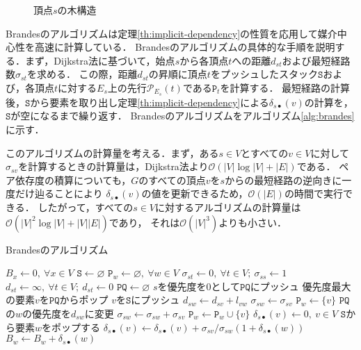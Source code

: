 \begin{figure}[tb]
  \centering
  \def\svgwidth{.35\linewidth}
  
  \caption{頂点$s$の木構造}
  \label{fig:implicit-dependency-2}
\end{figure}

Brandesのアルゴリズムは定理\ref{th:implicit-dependency}の性質を応用して媒介中心性を高速に計算している．
Brandesのアルゴリズムの具体的な手順を説明する．まず，Dijkstra法に基づいて，始点$s$から各頂点$t$への距離$d_{st}$および最短経路数$\sigma_{st}$を求める．
この際，距離$d_{st}$の昇順に頂点$t$をプッシュしたスタック$\texttt{S}$および，各頂点$t$に対する$E_{s}$上の先行$\mathcal{P}_{E_s}(t)$である$\texttt{P}_t$を計算する．
最短経路の計算後，$\texttt{S}$から要素を取り出し定理\ref{th:implicit-dependency}による$\delta_{s\bullet}(v)$の計算を，$\texttt{S}$が空になるまで繰り返す．
Brandesのアルゴリズムをアルゴリズム\ref{alg:brandes}に示す．

このアルゴリズムの計算量を考える．まず，ある$s\in V$とすべての$v\in V$に対して
$\sigma_{sv}$を計算するときの計算量は，Dijkstra法より$\mathcal{O}(|V|\log |V|+|E|)$である．
ペア依存度の積算についても，$G$のすべての頂点$v$を$s$からの最短経路の逆向きに一度だけ辿ることにより
$\delta_{s\bullet}(v)$の値を更新できるため，$\mathcal{O}(|E|)$の時間で実行できる\cite{Brandes2001}．
したがって，すべての$s\in V$に対するアルゴリズムの計算量は$\mathcal{O}(|V|^2\log |V|+|V||E|)$であり，
それは$\mathcal{O}(|V|^3)$よりも小さい．

\begin{algorithm}[H]
  \caption{Brandesのアルゴリズム}
  \label{alg:brandes}
  \begin{algorithmic}[1]\small
    \State $B_x\gets 0,\:\forall x\in V$
    \State $\texttt{S}\gets\varnothing$
    \State $\texttt{P}_w\gets\varnothing,\:\forall w\in V$
    \State $\sigma_{st}\gets 0,\:\forall t\in V;\:\sigma_{ss}\gets 1$
    \State $d_{st}\gets\infty,\:\forall t\in V;\:d_{st}\gets 0$
    \State $\texttt{PQ}\gets\varnothing$
    \State $s$を優先度を$0$として$\texttt{PQ}$にプッシュ
    \State 優先度最大の要素$v$を$\texttt{PQ}$からポップ
    \State $v$を$\texttt{S}$にプッシュ
    \State $d_{sw}\gets d_{sv}+l_{vw}$
    \State $\sigma_{sw}\gets\sigma_{sv}$
    \State $\texttt{P}_w\gets\{v\}$
    \State $\texttt{PQ}$の$w$の優先度を$d_{sw}$に変更
    \EndIf
    \State $\sigma_{sw}\gets\sigma_{sw}+\sigma_{sv}$
    \State $\texttt{P}_w\gets\texttt{P}_w\cup\{v\}$
    \EndIf
    \EndFor
    \EndWhile
    \State $\delta_{s\bullet}(v)\gets 0,\:v\in V$
    \State $\texttt{S}$から要素$w$をポップする
    \State $\delta_{s\bullet}(v)\gets\delta_{s\bullet}(v)+\sigma_{sv}/\sigma_{sw}(1+\delta_{s\bullet}(w))$
    \EndFor
    \State $B_w\gets B_w+\delta_{s\bullet}(w)$
    \EndIf
    \EndWhile
    \EndFor
    \EndProcedure
  \end{algorithmic}
\end{algorithm}

